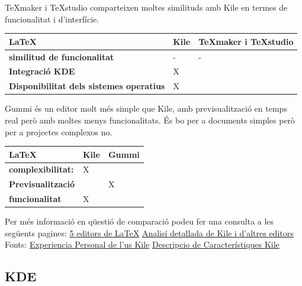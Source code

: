 TeXmaker i TeXstudio comparteixen moltes similituds amb Kile en termes de funcionalitat i d'interfície. \\

\begin{table}[h!]
 \begin{tabular}{|l|l|l|}
\hline
 \LaTeX & \textbf{Kile} & \textbf{TeXmaker i TeXstudio} \\ \hline
 \textbf{similitud de funcionalitat} & - & - \\ \hline
 \textbf{Integració KDE} & X & \\ \hline
 \textbf{Disponibilitat dels sistemes operatius} & X &  \\ \hline
 \end{tabular}
\end{table}

Gummi és un editor molt més simple que Kile, amb previsualització en temps real però amb moltes menys funcionalitats. És bo per a documents simples però per a projectes complexos no. \\
\begin{table}[h!]
 \begin{tabular}{|l|l|l|}
\hline
 \LaTeX & \textbf{Kile} & \textbf{Gummi} \\ \hline
 \textbf{complexibilitat:}  & X &  \\ \hline
 \textbf{Previsualització} &  & X \\ \hline
 \textbf{funcionalitat} & X &  \\ \hline
 \end{tabular}
\end{table}

Per més informació en qüestió de comparació podeu fer una consulta a les següents pagines: \href{https://osluca.uca.es/noticia/cinco-editores-de-latex-libres/}{5 editors de LaTeX} \href{https://latex.org/forum/viewtopic.php?t=208}{Analisí detallada de Kile i d'altres editors}
Fonts: \href{https://iloo.wordpress.com/2010/10/20/kile-otro-editor-latex/}{Experiencia Personal de l'us Kile} \href{https://www.kdeblog.com/editor-de-latex-para-kde-kile.html}{Descripcio de Característiques Kile}

\subsection{KDE}\label{subsec:KDE}

























